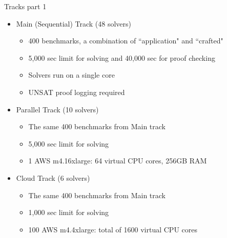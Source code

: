 \documentclass[trans]{beamer}
\begin{document}
\begin{frame}{Tracks part 1}
\begin{itemize}
\item Main (Sequential) Track (48 solvers)
\begin{itemize}
\item 400 benchmarks, a combination of ``application" and ``crafted"
\item 5,000 sec limit for solving and 40,000 sec for proof checking
\item Solvers run on a single core
\item UNSAT proof logging required
\end{itemize}
\pause
\medskip
\item Parallel Track (10 solvers)
\begin{itemize}
\item The same 400 benchmarks from Main track
\item 5,000 sec limit for solving
\item 1 AWS m4.16xlarge: 64 virtual CPU cores, 256GB RAM
\end{itemize}
\pause
\medskip
\item Cloud Track (6 solvers)
\begin{itemize}
\item The same 400 benchmarks from Main track
\item 1,000 sec limit for solving
\item 100 AWS m4.4xlarge: total of 1600 virtual CPU cores
\end{itemize}
\end{itemize}
\end{frame}
\end{document}
